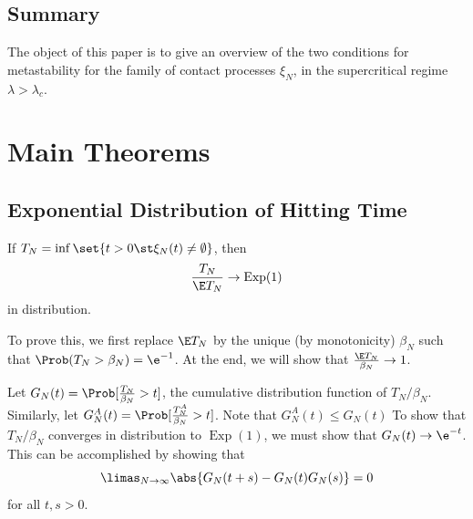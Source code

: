 \documentclass{scrartcl}
\DeclareMathOperator{\expDist}{Exp}
\begin{document}
\subsection{Summary}

The object of this paper is to give an overview of the two conditions for metastability for the family of contact processes $\xi_{N}$, in the supercritical regime $\lambda > \lambda_{c}$.

\section{Main Theorems}

\subsection{Exponential Distribution of Hitting Time}

\begin{theorem}
  If $T_{N} = \inf\set{t > 0 \st \xi_{N}(t) \neq \emptyset}$, then
  \[ \frac{T_{N}}{\E T_{N}} \to \expDist(1) \]
  in distribution.
\end{theorem}

To prove this, we first replace $\E T_{N}$ by the unique (by monotonicity) $\beta_{N}$ such that $\Prob(T_{N} > \beta_{N}) = \e^{-1}$. At the end, we will show that $\frac{\E T_{N}}{\beta_{N}} \to 1$.

Let $G_{N}(t) = \Prob[\frac{T_{N}}{\beta_{N}} > t]$, the cumulative distribution function of $T_{N}/\beta_{N}$. Similarly, let $G_{N}^{A}(t) = \Prob[\frac{T^{A}_{N}}{\beta_{N}} > t]$. Note that $G_{N}^{A}(t) \leq G_{N}(t)$ To show that $T_{N}/\beta_{N}$ converges in distribution to $\expDist(1)$, we must show that $G_{N}(t) \to \e^{-t}$. This can be accomplished by showing that
\[ \limas_{N \to \infty} \abs{G_{N}(t+s) - G_{N}(t)G_{N}(s)} = 0 \]
for all $t,s > 0$.

%
%
\end{document}
